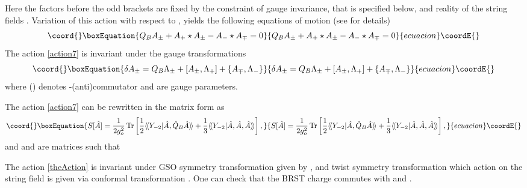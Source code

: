 \documentclass[a4paper,12pt]{article}
\providecommand{\ra}{\rightarrow}
\providecommand{\Tr}{\mathop{\mathrm{Tr}}\nolimits}
\providecommand{\la}{\langle\!\langle}
\renewcommand{\ra}{\rangle\!\rangle}
\begin{document}
Here the factors before the odd brackets are fixed by the
constraint of gauge invariance, that is specified below, and
reality of the string fields \coordHE{}. Variation of
this action with respect to \coordHE{}, \coordHE{}
yields the following equations of motion (see \cite{ABKM} for details)
\begin{equation}\coord{}\boxEquation{
Q_BA_{\pm}+A_+\star A_{\pm}
-A_-\star A_{\mp}=0
\label{eqmotion}
}{
Q_BA_{\pm}+A_+\star A_{\pm}
-A_-\star A_{\mp}=0
}{ecuacion}\coordE{}\end{equation}
The action \eqref{action7} is invariant under the
gauge transformations
\begin{equation*}\coord{}\boxEquation{
\delta A_{\pm}=Q_B\Lambda_{\pm}+[A_{\pm},\Lambda_+]
+\{A_{\mp},\Lambda_-\}
}{
\delta A_{\pm}=Q_B\Lambda_{\pm}+[A_{\pm},\Lambda_+]
+\{A_{\mp},\Lambda_-\}
}{ecuacion}\coordE{}\end{equation*}
where \myHighlight{$[\,,]$}\coordHE{} (\myHighlight{$\{\,,\}$}\coordHE{}) denotes \myHighlight{$\star$}\coordHE{}-(anti)commutator
and \myHighlight{$\Lambda_{\pm}$}\coordHE{} are gauge parameters.

The action \eqref{action7}
can be rewritten in the matrix form
 as
\begin{equation}\coord{}\boxEquation{
S[\hat{A}]=\frac{1}{2g_o^2}\Tr\left[\frac{1}{2}\la Y_{-2}|\hat{A},\hat{Q}_B\hat{A}\ra
+\frac13\la Y_{-2}|\hat{A},\hat{A},\hat{A}\ra\right],
\label{theAction}
}{
S[\hat{A}]=\frac{1}{2g_o^2}\Tr\left[\frac{1}{2}\la Y_{-2}|\hat{A},\hat{Q}_B\hat{A}\ra
+\frac13\la Y_{-2}|\hat{A},\hat{A},\hat{A}\ra\right],
}{ecuacion}\coordE{}\end{equation}
\coordHE{} and \coordHE{} and \coordHE{} are \coordHE{} matrices such that
\coordHE{}

The action \eqref{theAction} is invariant under GSO symmetry transformation given by
\coordHE{},
and twist symmetry transformation \myHighlight{$\Omega$}\coordHE{} which action on the string field
is given via conformal transformation \coordHE{}.
One can check that the BRST charge \coordHE{} commutes with \coordHE{}
and \myHighlight{$\Omega$}\coordHE{}.
\end{document}
